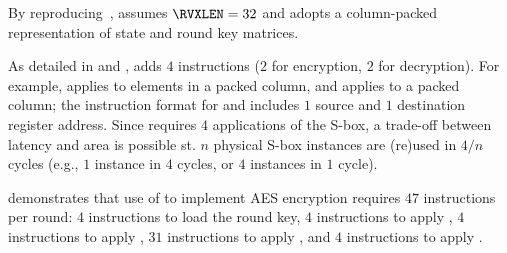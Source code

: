 
By reproducing~\cite[Section 4.2]{TilGro:06},
assumes 
$\RVXLEN = 32$
and adopts a 
column-packed 
representation of state and round key matrices.

As detailed in
and
,
adds
$ 4$
instructions ($2$ for encryption, $2$ for decryption).
For example,
applies 
to elements in   a packed column,
and
applies 
to               a packed column;
the instruction format for
and
includes $1$ source and $1$ destination register address.
Since 
requires $4$ applications of the S-box, a trade-off between latency and
area is possible st. 
$n$ physical S-box instances are (re)used in $4/n$ cycles
(e.g., $1$ instance in $4$ cycles, or $4$ instances in $1$ cycle).

demonstrates that use of  to implement AES encryption requires
$47$ instructions per round:
$ 4$            
     instructions to load the round key,
$ 4$            
     instructions to apply ,
$ 4$   
     instructions to apply ,
$31$ instructions to apply ,
and
$ 4$   
     instructions to apply .

